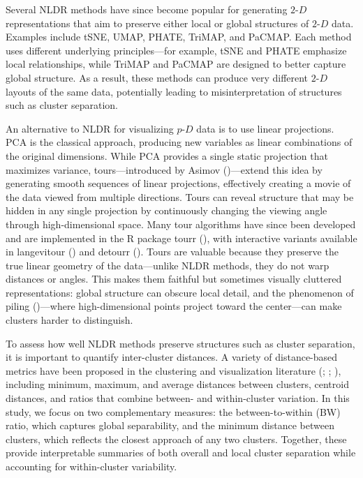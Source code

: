 \documentclass[
  11pt,
  a4paper,
]{report}
\newcommand\pD{$p\text{-}D$}
\newcommand\gD{$2\text{-}D$}
\begin{document}
Several NLDR methods have since become popular for generating \gD{}
representations that aim to preserve either local or global structures
of \gD{} data. Examples include tSNE, UMAP, PHATE, TriMAP, and PaCMAP.
Each method uses different underlying principles---for example, tSNE and
PHATE emphasize local relationships, while TriMAP and PaCMAP are
designed to better capture global structure. As a result, these methods
can produce very different \gD{} layouts of the same data, potentially
leading to misinterpretation of structures such as cluster separation.

An alternative to NLDR for visualizing \pD{} data is to use linear
projections. PCA is the classical approach, producing new variables as
linear combinations of the original dimensions. While PCA provides a
single static projection that maximizes variance, tours---introduced by
Asimov ()---extend this idea by generating
smooth sequences of linear projections, effectively creating a movie of
the data viewed from multiple directions. Tours can reveal structure
that may be hidden in any single projection by continuously changing the
viewing angle through high-dimensional space. Many tour algorithms have
since been developed and are implemented in the R package tourr
(), with interactive
variants available in langevitour () and detourr (). Tours
are valuable because they preserve the true linear geometry of the
data---unlike NLDR methods, they do not warp distances or angles. This
makes them faithful but sometimes visually cluttered representations:
global structure can obscure local detail, and the phenomenon of piling
()---where high-dimensional
points project toward the center---can make clusters harder to
distinguish.

To assess how well NLDR methods preserve structures such as cluster
separation, it is important to quantify inter-cluster distances. A
variety of distance-based metrics have been proposed in the clustering
and visualization literature
(;
;
), including minimum,
maximum, and average distances between clusters, centroid distances, and
ratios that combine between- and within-cluster variation. In this
study, we focus on two complementary measures: the between-to-within
(BW) ratio, which captures global separability, and the minimum distance
between clusters, which reflects the closest approach of any two
clusters. Together, these provide interpretable summaries of both
overall and local cluster separation while accounting for within-cluster
variability.
\end{document}
